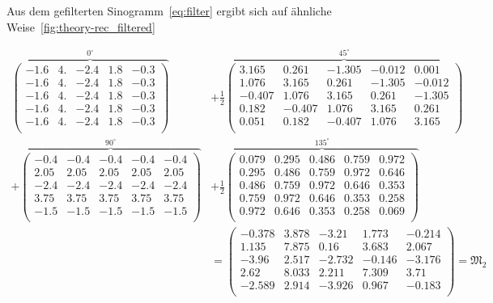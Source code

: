 \documentclass[slug=PET, room=Andreas-Schubert-Bau\,\ 424A, supervisor=Carsten\ Bittrich, coursedate=10.\ 01.\ 2020]{../../Lab_Report_LaTeX/lab_report}
\begin{document}
Aus dem gefilterten Sinogramm~\eqref{eq:filter} ergibt sich auf
\"ahnliche Weise~\ref{fig:theory-rec_filtered}

{\footnotesize
\setlength{\arraycolsep}{2.5pt}

\begin{align}
  \label{eq:simplerepr}
  \overbrace{\begin{pmatrix}
      -1.6 & 4. & -2.4 & 1.8 & -0.3\\
      -1.6 & 4. & -2.4 & 1.8 & -0.3\\
      -1.6 & 4. & -2.4 & 1.8 & -0.3\\
      -1.6 & 4. & -2.4 & 1.8 & -0.3\\
      -1.6 & 4. & -2.4 & 1.8 & -0.3\\
    \end{pmatrix}}^{0^\circ} & + \frac{1}{2}\overbrace{\begin{pmatrix}
      3.165 & 0.261 & -1.305 & -0.012 & 0.001\\
      1.076 & 3.165 & 0.261 & -1.305 & -0.012\\
      -0.407 & 1.076 & 3.165 & 0.261 & -1.305\\
      0.182 & -0.407 & 1.076 & 3.165 & 0.261\\
      0.051 & 0.182 & -0.407 & 1.076 & 3.165\\
    \end{pmatrix}}^{45^\circ} \nonumber \\ +
  \overbrace{\begin{pmatrix}
      -0.4 & -0.4 & -0.4 & -0.4 & -0.4\\
      2.05 & 2.05 & 2.05 & 2.05 & 2.05\\
      -2.4 & -2.4 & -2.4 & -2.4 & -2.4\\
      3.75 & 3.75 & 3.75 & 3.75 & 3.75\\
      -1.5 & -1.5 & -1.5 & -1.5 & -1.5\\
    \end{pmatrix}}^{90^\circ} &+ \frac{1}{2}\overbrace{\begin{pmatrix}
      0.079 & 0.295 & 0.486 & 0.759 & 0.972\\
      0.295 & 0.486 & 0.759 & 0.972 & 0.646\\
      0.486 & 0.759 & 0.972 & 0.646 & 0.353\\
      0.759 & 0.972 & 0.646 & 0.353 & 0.258\\
      0.972 & 0.646 & 0.353 & 0.258 & 0.069\\
    \end{pmatrix}}^{135^\circ}\nonumber \\
           &= \begin{pmatrix}
             -0.378 & 3.878 & -3.21 & 1.773 & -0.214\\
             1.135 & 7.875 & 0.16 & 3.683 & 2.067\\
             -3.96 & 2.517 & -2.732 & -0.146 & -3.176\\
             2.62 & 8.033 & 2.211 & 7.309 & 3.71\\
             -2.589 & 2.914 & -3.926 & 0.967 & -0.183\\
           \end{pmatrix} = \mathfrak{M}_2
\end{align}
}
\end{document}
